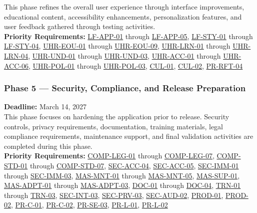 \documentclass[12pt]{article}
\begin{document}
This phase refines the overall user experience through interface improvements, educational content, accessibility enhancements, personalization features, and user feedback gathered through testing activities. \\

\noindent\textbf{Priority Requirements:} \hyperlink{req:LF-APP-01}{LF-APP-01} through \hyperlink{req:LF-APP-05}{LF-APP-05}, \hyperlink{req:LF-STY-01}{LF-STY-01} through \hyperlink{req:LF-STY-04}{LF-STY-04}, \hyperlink{req:UHR-EOU-01}{UHR-EOU-01} through \hyperlink{req:UHR-EOU-09}{UHR-EOU-09}, \hyperlink{req:UHR-LRN-01}{UHR-LRN-01} through \hyperlink{req:UHR-LRN-04}{UHR-LRN-04}, \hyperlink{req:UHR-UND-01}{UHR-UND-01} through \hyperlink{req:UHR-UND-03}{UHR-UND-03}, \hyperlink{req:UHR-ACC-01}{UHR-ACC-01} through \hyperlink{req:UHR-ACC-06}{UHR-ACC-06}, \hyperlink{req:UHR-POL-01}{UHR-POL-01} through \hyperlink{req:UHR-POL-03}{UHR-POL-03}, \hyperlink{req:CUL-01}{CUL-01}, \hyperlink{req:CUL-02}{CUL-02}, \hyperlink{req:PR-RFT-04}{PR-RFT-04}

\subsubsection{Phase 5 --- Security, Compliance, and Release Preparation} 
\noindent\textbf{Deadline:} March 14, 2027 \\

This phase focuses on hardening the application prior to release. Security controls, privacy requirements, documentation, training materials, legal compliance requirements, maintenance support, and final validation activities are completed during this phase.\\

\noindent\textbf{Priority Requirements:} \hyperlink{req:COMP-LEG-01}{COMP-LEG-01} through \hyperlink{req:COMP-LEG-07}{COMP-LEG-07}, \hyperlink{req:COMP-STD-01}{COMP-STD-01} through \hyperlink{req:COMP-STD-07}{COMP-STD-07}, \hyperlink{req:SEC-ACC-04}{SEC-ACC-04}, \hyperlink{req:SEC-ACC-05}{SEC-ACC-05}, \hyperlink{req:SEC-IMM-01}{SEC-IMM-01} through \hyperlink{req:SEC-IMM-03}{SEC-IMM-03}, \hyperlink{req:MAS-MNT-01}{MAS-MNT-01} through \hyperlink{req:MAS-MNT-05}{MAS-MNT-05}, \hyperlink{req:MAS-SUP-01}{MAS-SUP-01}, \hyperlink{req:MAS-ADPT-01}{MAS-ADPT-01} through \hyperlink{req:MAS-ADPT-03}{MAS-ADPT-03}, \hyperlink{req:DOC-01}{DOC-01} through \hyperlink{req:DOC-04}{DOC-04}, \hyperlink{req:TRN-01}{TRN-01} through \hyperlink{req:TRN-03}{TRN-03}, \hyperlink{req:SEC-INT-03}{SEC-INT-03}, \hyperlink{req:SEC-PRV-03}{SEC-PRV-03}, \hyperlink{req:SEC-AUD-02}{SEC-AUD-02}, \hyperlink{req:PROD-01}{PROD-01}, \hyperlink{req:PROD-02}{PROD-02}, \hyperlink{req:PR-C-01}{PR-C-01}, \hyperlink{req:PR-C-02}{PR-C-02}, \hyperlink{req:PR-SE-03}{PR-SE-03}, \hyperlink{req:PR-L-01}{PR-L-01}, \hyperlink{req:PR-L-02}{PR-L-02}
\end{document}
